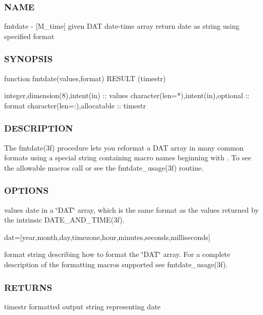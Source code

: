 \subsubsection*{N\+A\+ME}

fmtdate -\/ \mbox{[}M\+\_\+time\mbox{]} given D\+AT date-\/time array return date as string using specified format 

\subsubsection*{S\+Y\+N\+O\+P\+S\+IS}

\begin{DoxyVerb}function fmtdate(values,format) RESULT (timestr)

 integer,dimension(8),intent(in)      :: values
 character(len=*),intent(in),optional :: format
 character(len=:),allocatable         :: timestr
\end{DoxyVerb}


\subsubsection*{D\+E\+S\+C\+R\+I\+P\+T\+I\+ON}

The fmtdate(3f) procedure lets you reformat a D\+AT array in many common formats using a special string containing macro names beginning with \textquotesingle{}\textquotesingle{}. To see the allowable macros call or see the fmtdate\+\_\+usage(3f) routine.

\subsubsection*{O\+P\+T\+I\+O\+NS}

values date in a \char`\"{}\+D\+A\+T\char`\"{} array, which is the same format as the values returned by the intrinsic D\+A\+T\+E\+\_\+\+A\+N\+D\+\_\+\+T\+I\+M\+E(3f).

dat=\mbox{[}year,month,day,timezone,hour,minutes,seconds,milliseconds\mbox{]}

format string describing how to format the \char`\"{}\+D\+A\+T\char`\"{} array. For a complete description of the formatting macros supported see fmtdate\+\_\+usage(3f). \subsubsection*{R\+E\+T\+U\+R\+NS}

timestr formatted output string representing date

